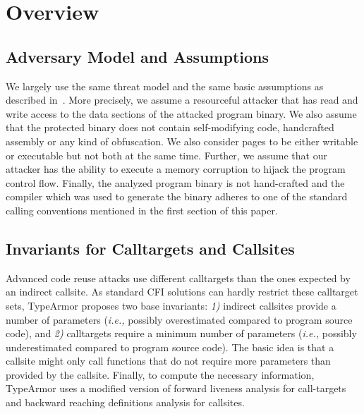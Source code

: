 \section{Overview}
\label{chapter:TypeShild Overview}

\subsection{Adversary Model and Assumptions}
\label{Adversary Model}

We largely use the same threat model and the same basic assumptions as described in~\cite{veen:typearmor}. 
More precisely, we assume a resourceful attacker that has read and write access to the data 
sections of the attacked program binary. We also assume that the protected binary does not contain 
self-modifying code, handcrafted assembly or any kind of obfuscation. We also consider pages 
to be either writable or executable but not both at the same time. Further, we assume 
that our attacker has the ability to execute a memory corruption to hijack the program
control flow. Finally, the analyzed program binary is not hand-crafted and the compiler
which was used to generate the binary adheres to one of the 
standard calling conventions mentioned in the first section of this paper.

\subsection{Invariants for Calltargets and Callsites}
\label{Invariants for Targets and Callsites}
Advanced code reuse attacks use different calltargets than the ones expected by an indirect 
callsite. As standard CFI solutions can hardly restrict these calltarget sets, TypeArmor proposes two base invariants:
\textit{1)} indirect callsites provide a number of parameters (\textit{i.e.,} possibly overestimated compared to program source code), and 
\textit{2)} calltargets require a minimum number of parameters (\textit{i.e.,} possibly underestimated compared to program source code).
The basic idea is that a callsite might only call functions that do not require more parameters than provided by the callsite. 
Finally, to compute the necessary information, TypeArmor uses a modified version of forward liveness analysis for call-targets and 
backward reaching definitions analysis for callsites.

